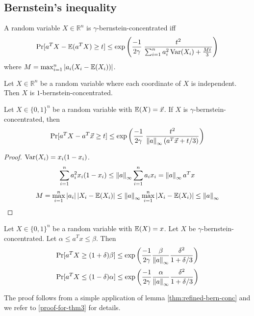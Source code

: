 \subsection{Bernstein's inequality}

\begin{definition}
A random variable $X \in \mathbb{R}^n$ is $\gamma$-bernstein-concentrated iff
\[ \Pr[a^TX - \operatorname{\mathbb{E}}(a^TX) \ge t]
\le \exp\left( \frac{-1}{2\gamma} \; \frac{t^2}{\sum_{i=1}^n a_i^2 \operatorname*{Var}(X_i) + \frac{Mt}{3}} \right) \]
where $M = \max_{i=1}^n \left\lvert a_i(X_i - \operatorname{\mathbb{E}}(X_i)) \right\rvert$.
\end{definition}

\begin{theorem}
Let $X \in \mathbb{R}^n$ be a random variable where each coordinate of $X$ is independent.
Then $X$ is $1$-bernstein-concentrated.
\end{theorem}

\begin{lemma}
\label{thm:refined-bern-conc}
Let $X \in \{0, 1\}^n$ be a random variable with $\operatorname{\mathbb{E}}(X) = \vec{x}$.
If $X$ is $\gamma$-bernstein-concentrated, then
\[ \Pr[a^TX - a^T\vec{x} \ge t]
\le \exp\left( \frac{-1}{2\gamma} \; \frac{t^2}{\left\lVert a \right\rVert_{\infty}(a^T\vec{x} + t/3)} \right) \]
\end{lemma}
\begin{proof}
$\operatorname*{Var}(X_i) = x_i(1-x_i)$.
\[ \sum_{i=1}^n a_i^2 x_i(1-x_i)
\le \left\lVert a \right\rVert_{\infty} \sum_{i=1}^n a_ix_i
= \left\lVert a \right\rVert_{\infty} a^Tx \]
\[ M = \max_{i=1}^n \left\lvert a_i \right\rvert\left\lvert X_i - \operatorname{\mathbb{E}}(X_i) \right\rvert
\le \left\lVert a \right\rVert_{\infty} \max_{i=1}^n \left\lvert X_i - \operatorname{\mathbb{E}}(X_i) \right\rvert
\le \left\lVert a \right\rVert_{\infty} \]
\end{proof}

\begin{theorem}
\label{thm:lin-bound-bern-conc}
Let $X \in \{0, 1\}^n$ be a random variable with $\operatorname{\mathbb{E}}(X) = x$.
Let $X$ be $\gamma$-bernstein-concentrated.
Let $\alpha \le a^Tx \le \beta$. Then
\[ \Pr[ a^TX \ge (1+\delta)\beta ]
\le \exp\left(\frac{-1}{2\gamma} \frac{\beta}{\left\lVert a \right\rVert_{\infty}} \frac{\delta^2}{1+\delta/3} \right) \]
\[ \Pr[ a^TX \le (1-\delta)\alpha ]
\le \exp\left(\frac{-1}{2\gamma} \frac{\alpha}{\left\lVert a \right\rVert_{\infty}} \frac{\delta^2}{1+\delta/3} \right) \]
\end{theorem}
The proof follows from a simple application of lemma \ref{thm:refined-bern-conc} and we refer to \ref{proof-for-thm3} for details.